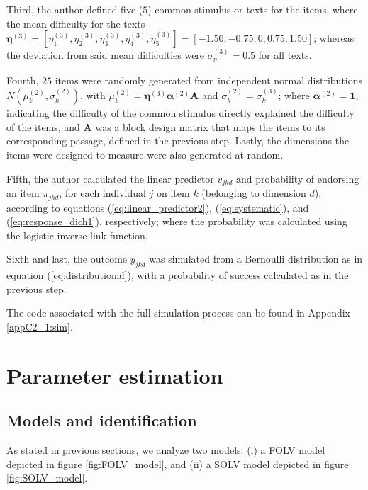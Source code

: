Third, the author defined five ($5$) common stimulus or texts for the items, where the mean difficulty for the texts $\pmb{\eta}^{(3)} = [\eta^{(3)}_{1}, \eta^{(3)}_{2}, \eta^{(3)}_{3}, \eta^{(3)}_{4}, \eta^{(3)}_{5}] = [-1.50, -0.75, 0, 0.75, 1.50]$; whereas the deviation from said mean difficulties were $\sigma^{(3)}_{\eta} = 0.5$ for all texts. 

Fourth, $25$ items were randomly generated from independent normal distributions $N( \mu^{(2)}_{k}, \sigma^{(2)}_{k} ) $, with $\mu^{(2)}_{k} = \pmb{\eta}^{(3)} \pmb{\alpha}^{(2)} \mathbf{A}$ and $\sigma^{(2)}_{k} = \sigma^{(3)}_{k}$; where $\pmb{\alpha}^{(2)} = \mathbf{1}$, indicating the difficulty of the common stimulus directly explained the difficulty of the items, and $\mathbf{A}$ was a block design matrix that maps the items to its corresponding passage, defined in the previous step. Lastly, the dimensions the items were designed to measure were also generated at random.

Fifth, the author calculated the linear predictor $v_{jkd}$ and probability of endorsing an item $\pi_{jkd}$, for each individual $j$ on item $k$ (belonging to dimension $d$), according to equations (\ref{eq:linear_predictor2}), (\ref{eq:systematic}), and (\ref{eq:response_dich1}), respectively; where the probability was calculated using the logistic inverse-link function.
	
Sixth and last, the outcome $y_{jkd}$ was simulated from a Bernoulli distribution as in equation (\ref{eq:distributional}), with a probability of success calculated as in the previous step.

The code associated with the full simulation process can be found in Appendix \ref{appC2_1:sim}.


\section{Parameter estimation}

\subsection{Models and identification}

As stated in previous sections, we analyze two models: (i) a FOLV model depicted in figure \ref{fig:FOLV_model}, and (ii) a SOLV model depicted in figure \ref{fig:SOLV_model}.


